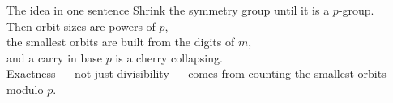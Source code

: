 \documentclass[aspectratio=169,11pt]{beamer}
\begin{document}
\begin{frame}{The idea in one sentence}
  \centering\Large
  Shrink the symmetry group until it is a $p$-group.\\[8pt]
  Then orbit sizes are powers of $p$,\\[4pt]
  the smallest orbits are built from the digits of $m$,\\[4pt]
  and a carry in base $p$ is a cherry collapsing.\\[14pt]
  \normalsize
  Exactness --- not just divisibility --- comes from counting the smallest orbits modulo $p$.
\end{frame}
\end{document}
